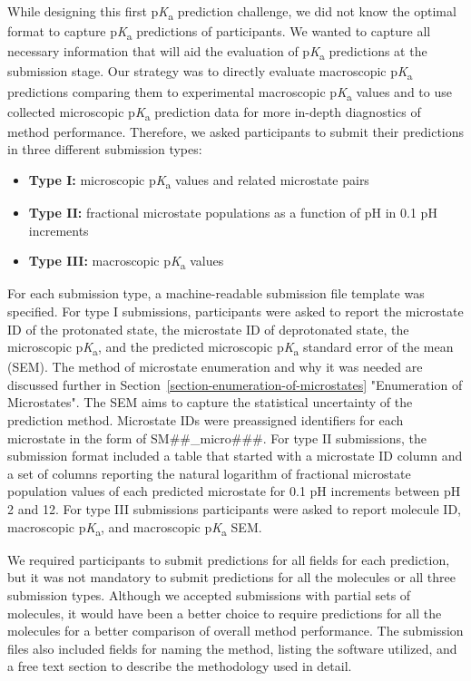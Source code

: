 \documentclass[9pt,lineno,final]{elife}
\newcommand{\pKa}{p\textit{K}\textsubscript{a}}
\begin{document}
While designing this first \pKa{} prediction challenge, we did not know the optimal format to capture \pKa{} predictions of participants. 
We wanted to capture all necessary information that will aid the evaluation of \pKa{} predictions at the submission stage. 
Our strategy was to directly evaluate macroscopic \pKa{} predictions comparing them to experimental macroscopic \pKa{} values and to use collected microscopic \pKa{} prediction data for more in-depth diagnostics of method performance.
Therefore, we asked participants to submit their predictions in three different submission types: 
\begin{itemize}
\item {\bf Type I:} microscopic \pKa{} values and related microstate pairs
\item {\bf Type II:} fractional microstate populations as a function of pH in 0.1 pH increments
\item {\bf Type III:} macroscopic \pKa{} values
\end{itemize}

For each submission type, a machine-readable submission file template was specified. 
For type I submissions, participants were asked to report the microstate ID of the protonated state, the microstate ID of deprotonated state, the microscopic \pKa{}, and the predicted microscopic \pKa{} standard error of the mean (SEM).  
The method of microstate enumeration and why it was needed are discussed further in Section~\ref{section-enumeration-of-microstates} "Enumeration of Microstates".
The SEM aims to capture the statistical uncertainty of the prediction method. 
Microstate IDs were preassigned identifiers for each microstate in the form of SM\#\#\_micro\#\#\#. 
For type II submissions, the submission format included a table that started with a microstate ID column and a set of columns reporting the natural logarithm of fractional microstate population values of each predicted microstate for 0.1 pH increments between pH 2 and 12.
For type III submissions participants were asked to report molecule ID, macroscopic \pKa{}, and macroscopic \pKa{} SEM.  

We required participants to submit predictions for all fields for each prediction, but it was not mandatory to submit predictions for all the molecules or all three submission types. 
Although we accepted submissions with partial sets of molecules, it would have been a better choice to require predictions for all the molecules for a better comparison of overall method performance. 
The submission files also included fields for naming the method, listing the software utilized, and a free text section to describe the methodology used in detail. 
\end{document}
